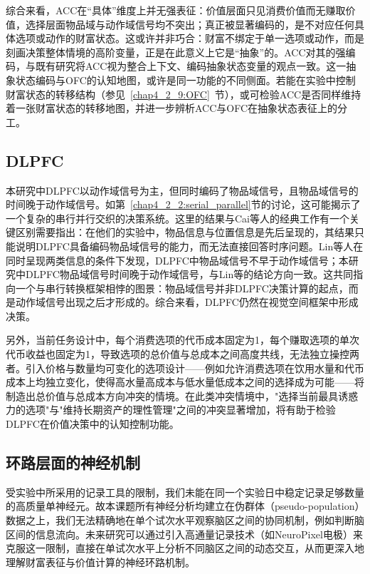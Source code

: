 综合来看，ACC在“具体”维度上并无强表征：价值层面只见消费价值而无赚取价值，选择层面物品域与动作域信号均不突出；真正被显著编码的，是不对应任何具体选项或动作的财富状态。这或许并非巧合：财富不绑定于单一选项或动作，而是刻画决策整体情境的高阶变量，正是在此意义上它是“抽象”的。ACC对其的强编码，与既有研究将ACC视为整合上下文、编码抽象状态变量的观点一致\citep{heilbronner2016dorsal, monosov2020anterior}。这一抽象状态编码与OFC的认知地图，或许是同一功能的不同侧面。若能在实验中控制财富状态的转移结构（参见~\ref{chap4_2_9:OFC}~节），或可检验ACC是否同样维持着一张财富状态的转移地图，并进一步辨析ACC与OFC在抽象状态表征上的分工。

\subsection{DLPFC}\label{chap4_2_11:DLPFC}

本研究中DLPFC以动作域信号为主，但同时编码了物品域信号，且物品域信号的时间晚于动作域信号。如第~\ref{chap4_2_2:serial_parallel}节的讨论，这可能揭示了一个复杂的串行并行交织的决策系统。这里的结果与Cai等人\citep{cai2014contributions}的经典工作有一个关键区别需要指出：在他们的实验中，物品信息与位置信息是先后呈现的，其结果只能说明DLPFC具备编码物品域信号的能力，而无法直接回答时序问题。Lin等人\citep{lin2020evidence}在同时呈现两类信息的条件下发现，DLPFC中物品域信号不早于动作域信号；本研究中DLPFC物品域信号时间晚于动作域信号，与Lin等的结论方向一致。这共同指向一个与串行转换框架相悖的图景：物品域信号并非DLPFC决策计算的起点，而是动作域信号出现之后才形成的。综合来看，DLPFC仍然在视觉空间框架中形成决策。

另外，当前任务设计中，每个消费选项的代币成本固定为1，每个赚取选项的单次代币收益也固定为1，导致选项的总价值与总成本之间高度共线，无法独立操控两者。引入价格与数量均可变化的选项设计——例如允许消费选项在饮用水量和代币成本上均独立变化，使得高水量高成本与低水量低成本之间的选择成为可能——将制造出总价值与总成本方向冲突的情境。在此类冲突情境中，"选择当前最具诱惑力的选项"与"维持长期资产的理性管理"之间的冲突显著增加，将有助于检验DLPFC在价值决策中的认知控制功能。

\subsection{环路层面的神经机制}\label{chap4_2_12:circuit}

受实验中所采用的记录工具的限制，我们未能在同一个实验日中稳定记录足够数量的高质量单神经元。故本课题所有神经分析均建立在伪群体（pseudo-population）数据之上，我们无法精确地在单个试次水平观察脑区之间的协同机制，例如判断脑区间的信息流向。未来研究可以通过引入高通量记录技术（如NeuroPixel电极）来克服这一限制，直接在单试次水平上分析不同脑区之间的动态交互，从而更深入地理解财富表征与价值计算的神经环路机制。

